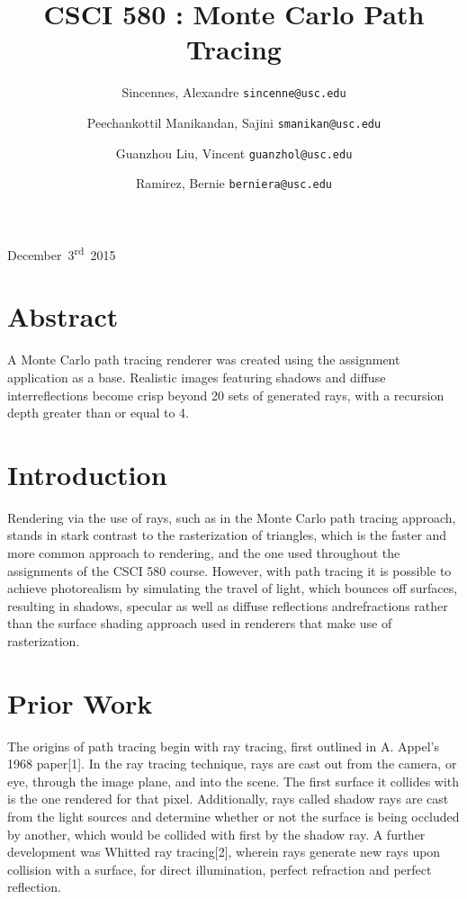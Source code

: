 \documentclass[12pt,journal]{IEEEtran}
\begin{document}
\title{CSCI 580 : Monte Carlo Path Tracing}
{December~3\textsuperscript{rd}~2015}
\author{
	Sincennes, Alexandre
	\texttt{sincenne@usc.edu}\\
	\and
 	Peechankottil Manikandan, Sajini
 	\texttt{smanikan@usc.edu}\\
  	\and
	Guanzhou Liu, Vincent
 	\texttt{guanzhol@usc.edu}\\
  	\and
	Ramirez, Bernie
 	\texttt{berniera@usc.edu}\\
  
}
\maketitle


\section{Abstract}
A Monte Carlo path tracing renderer was created using the assignment application as a base. Realistic images featuring shadows and diffuse interreflections become crisp beyond 20 sets of generated rays, with a recursion depth greater than or equal to 4.


\section{Introduction}
Rendering via the use of rays, such as in the Monte Carlo path tracing approach, stands in stark contrast to the rasterization of triangles, which is the faster and more common approach to rendering, and the one used throughout the assignments of the CSCI 580 course. However, with path tracing it is possible to achieve photorealism by simulating the travel of light, which bounces off surfaces, resulting in shadows, specular as well as diffuse reflections andrefractions rather than the surface shading approach used in renderers that make use of rasterization.


\section{Prior Work}
The origins of path tracing begin with ray tracing, first outlined in A. Appel's 1968 paper[1]. In the ray tracing technique, rays are cast out from the camera, or eye, through the image plane, and into the scene. The first surface it collides with is the one rendered for that pixel. Additionally, rays called shadow rays are cast from the light sources and determine whether or not the surface is being occluded by another, which would be collided with first by the shadow ray. A further development was Whitted ray tracing[2], wherein rays generate new rays upon collision with a surface, for direct illumination, perfect refraction and perfect reflection.
\end{document}
